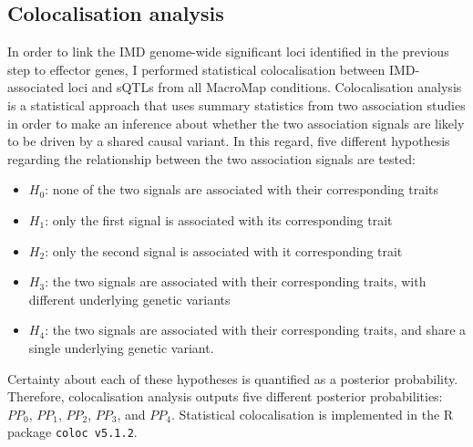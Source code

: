 \subsection{Colocalisation analysis}
In order to link the IMD genome-wide significant loci identified in the previous step to effector genes, I performed statistical colocalisation between IMD-associated loci and sQTLs from all MacroMap conditions. Colocalisation analysis is a statistical approach that uses summary statistics from two association studies in order to make an inference about whether the two association signals are likely to be driven by a shared causal variant. In this regard, five different hypothesis regarding the relationship between the two association signals are tested:
\begin{itemize}
  \item $H_{0}$: none of the two signals are associated with their corresponding traits
  \item $H_{1}$: only the first signal is associated with its corresponding trait
  \item $H_{2}$: only the second signal is associated with it corresponding trait
  \item $H_{3}$: the two signals are associated with their corresponding traits, with different underlying genetic variants
  \item $H_{4}$: the two signals are associated with their corresponding traits, and share a single underlying genetic variant.
\end{itemize}
Certainty about each of these hypotheses is quantified as a posterior probability. Therefore, colocalisation analysis outputs five different posterior probabilities: $PP_{0}$, $PP_{1}$, $PP_{2}$, $PP_{3}$, and $PP_{4}$. Statistical colocalisation is implemented in the R package \Verb+coloc v5.1.2+.\\


